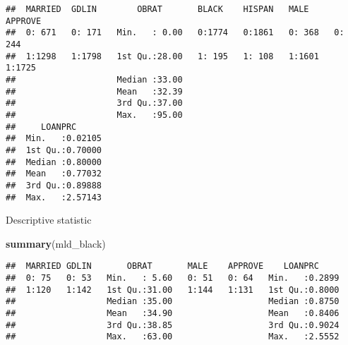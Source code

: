 \documentclass[]{article}
\newenvironment{Shaded}{\begin{snugshade}}{\end{snugshade}}
\newcommand{\DataTypeTok}[1]{\textcolor[rgb]{0.13,0.29,0.53}{#1}}
\newcommand{\DecValTok}[1]{\textcolor[rgb]{0.00,0.00,0.81}{#1}}
\newcommand{\KeywordTok}[1]{\textcolor[rgb]{0.13,0.29,0.53}{\textbf{#1}}}
\newcommand{\NormalTok}[1]{#1}
\newcommand{\OperatorTok}[1]{\textcolor[rgb]{0.81,0.36,0.00}{\textbf{#1}}}
\newcommand{\StringTok}[1]{\textcolor[rgb]{0.31,0.60,0.02}{#1}}
\begin{document}
\begin{Shaded}
\end{Shaded}

\begin{verbatim}
##  MARRIED  GDLIN        OBRAT       BLACK    HISPAN   MALE     APPROVE 
##  0: 671   0: 171   Min.   : 0.00   0:1774   0:1861   0: 368   0: 244  
##  1:1298   1:1798   1st Qu.:28.00   1: 195   1: 108   1:1601   1:1725  
##                    Median :33.00                                      
##                    Mean   :32.39                                      
##                    3rd Qu.:37.00                                      
##                    Max.   :95.00                                      
##     LOANPRC       
##  Min.   :0.02105  
##  1st Qu.:0.70000  
##  Median :0.80000  
##  Mean   :0.77032  
##  3rd Qu.:0.89888  
##  Max.   :2.57143
\end{verbatim}

Descriptive statistic

\begin{Shaded}
\begin{Highlighting}[]
\KeywordTok{summary}\NormalTok{(mld_black)}
\end{Highlighting}
\end{Shaded}

\begin{verbatim}
##  MARRIED GDLIN       OBRAT       MALE    APPROVE    LOANPRC      
##  0: 75   0: 53   Min.   : 5.60   0: 51   0: 64   Min.   :0.2899  
##  1:120   1:142   1st Qu.:31.00   1:144   1:131   1st Qu.:0.8000  
##                  Median :35.00                   Median :0.8750  
##                  Mean   :34.90                   Mean   :0.8406  
##                  3rd Qu.:38.85                   3rd Qu.:0.9024  
##                  Max.   :63.00                   Max.   :2.5552
\end{verbatim}
\end{document}
